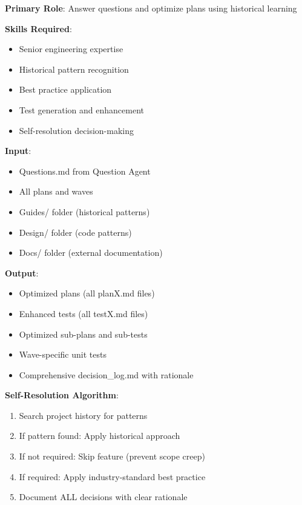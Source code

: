 \documentclass[12pt,letterpaper]{article}
\begin{document}
\begin{tcolorbox}[colback=red!5,colframe=red,title=Optimization Agent Specification]
\textbf{Primary Role}: Answer questions and optimize plans using historical learning

\textbf{Skills Required}:
\begin{itemize}
    \item Senior engineering expertise
    \item Historical pattern recognition
    \item Best practice application
    \item Test generation and enhancement
    \item Self-resolution decision-making
\end{itemize}

\textbf{Input}:
\begin{itemize}
    \item Questions.md from Question Agent
    \item All plans and waves
    \item Guides/ folder (historical patterns)
    \item Design/ folder (code patterns)
    \item Docs/ folder (external documentation)
\end{itemize}

\textbf{Output}:
\begin{itemize}
    \item Optimized plans (all planX.md files)
    \item Enhanced tests (all testX.md files)
    \item Optimized sub-plans and sub-tests
    \item Wave-specific unit tests
    \item Comprehensive decision\_log.md with rationale
\end{itemize}

\textbf{Self-Resolution Algorithm}:
\begin{enumerate}
    \item Search project history for patterns
    \item If pattern found: Apply historical approach
    \item If not required: Skip feature (prevent scope creep)
    \item If required: Apply industry-standard best practice
    \item Document ALL decisions with clear rationale
\end{enumerate}
\end{tcolorbox}
\end{document}
